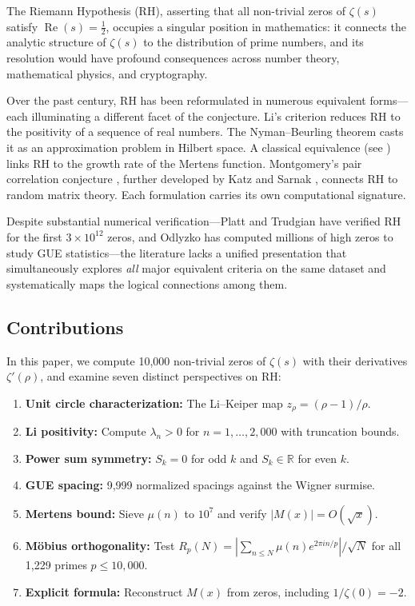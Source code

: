 \documentclass[11pt,a4paper]{article}
\theoremstyle{definition}
\DeclareMathOperator{\re}{Re}
\newcommand{\RR}{\mathbb{R}}
\begin{document}
The Riemann Hypothesis (RH), asserting that all non-trivial zeros of $\zeta(s)$ satisfy $\re(s) = \tfrac{1}{2}$, occupies a singular position in mathematics: it connects the analytic structure of $\zeta(s)$ to the distribution of prime numbers, and its resolution would have profound consequences across number theory, mathematical physics, and cryptography.

Over the past century, RH has been reformulated in numerous equivalent forms---each illuminating a different facet of the conjecture. Li's criterion \cite{Li1997,Keiper1992} reduces RH to the positivity of a sequence of real numbers. The Nyman--Beurling theorem \cite{Nyman1950,Beurling1955,BaezDuarte2005} casts it as an approximation problem in Hilbert space. A classical equivalence (see \cite[Ch.~14]{Titchmarsh1986}) links RH to the growth rate of the Mertens function. Montgomery's pair correlation conjecture \cite{Montgomery1973}, further developed by Katz and Sarnak \cite{KatzSarnak1999}, connects RH to random matrix theory. Each formulation carries its own computational signature.

Despite substantial numerical verification---Platt and Trudgian \cite{PlattTrudgian2021} have verified RH for the first $3 \times 10^{12}$ zeros, and Odlyzko \cite{Odlyzko1987,Odlyzko2001} has computed millions of high zeros to study GUE statistics---the literature lacks a unified presentation that simultaneously explores \emph{all} major equivalent criteria on the same dataset and systematically maps the logical connections among them.

\subsection*{Contributions}
In this paper, we compute 10{,}000 non-trivial zeros of $\zeta(s)$ with their derivatives $\zeta'(\rho)$, and examine seven distinct perspectives on RH:

\begin{enumerate}[label=\textbf{P\arabic*}]
  \item \textbf{Unit circle characterization:} The Li--Keiper map $z_\rho = (\rho-1)/\rho$.
  \item \textbf{Li positivity:} Compute $\lambda_n > 0$ for $n = 1, \ldots, 2{,}000$ with truncation bounds.
  \item \textbf{Power sum symmetry:} $S_k = 0$ for odd $k$ and $S_k \in \RR$ for even $k$.
  \item \textbf{GUE spacing:} 9{,}999 normalized spacings against the Wigner surmise.
  \item \textbf{Mertens bound:} Sieve $\mu(n)$ to $10^7$ and verify $|M(x)| = O(\sqrt{x})$.
  \item \textbf{M\"obius orthogonality:} Test $R_p(N) = |\sum_{n \leq N} \mu(n) e^{2\pi i n/p}| / \sqrt{N}$ for all 1{,}229 primes $p \leq 10{,}000$.
  \item \textbf{Explicit formula:} Reconstruct $M(x)$ from zeros, including $1/\zeta(0) = -2$.
\end{enumerate}
\end{document}
